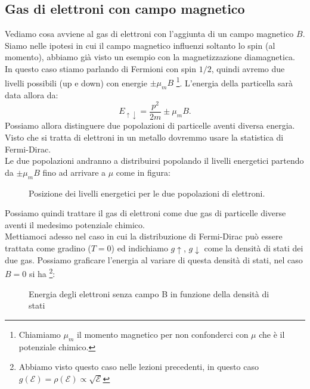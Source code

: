 \subsection{Gas di elettroni con campo magnetico}%
Vediamo cosa avviene al gas di elettroni con l'aggiunta di un campo magnetico $B$. Siamo nelle ipotesi in cui il campo magnetico influenzi soltanto lo spin (al momento), abbiamo già visto un esempio con la magnetizzazione diamagnetica. \\
In questo caso stiamo parlando di Fermioni con spin $1 /2$, quindi avremo due livelli possibili (up e down) con energie $\pm \mu_{m} B$ \footnote{Chiamiamo $\mu _{m}$ il momento magnetico per non confonderci con $\mu $ che è il potenziale chimico.}. L'energia della particella sarà data allora da:
\[
	E_{\uparrow \downarrow} = \frac{p^2}{2m} \pm \mu_{m}B
.\] 
Possiamo allora distinguere due popolazioni di particelle aventi diversa energia. Visto che si tratta di elettroni in un metallo dovremmo usare la statistica di Fermi-Dirac. \\
Le due popolazioni andranno a distribuirsi popolando il livelli energetici partendo da $\pm \mu_{m}B$ fino ad arrivare a $\mu$ come in figura:
\begin{figure}[H]
    \centering
    \caption{\scriptsize Posizione dei livelli energetici per le due popolazioni di elettroni.}
    \label{fig:spin-up-per-gas-di-elettroni-nel-campo-magnetico}
\end{figure}
\noindent
Possiamo quindi trattare il gas di elettroni come due gas di particelle diverse aventi il medesimo potenziale chimico.\\
Mettiamoci adesso nel caso in cui la distribuzione di Fermi-Dirac può essere trattata come gradino ($T = 0$) ed indichiamo $g\uparrow$, $g\downarrow$ come la densità di stati dei due gas. Possiamo graficare l'energia al variare di questa densità di stati, nel caso $B = 0$ si ha \footnote{Abbiamo visto questo caso nelle lezioni precedenti, in questo caso $g( \mathcal{E} ) = \rho ( \mathcal{E} ) \propto \sqrt{\mathcal{E} } $}:
\begin{figure}[H]
    \centering
    \caption{\scriptsize Energia degli elettroni senza campo B in funzione della densità di stati}
    \label{fig:energia-degli-elettroni-senza-campo-b-in-funzione-della-densita-di-stati}
\end{figure}
